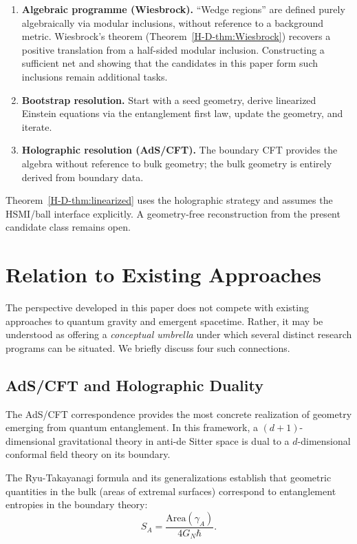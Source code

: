 \documentclass[12pt,a4paper,openany]{book}
\begin{document}
\begin{enumerate}
\item[(A)] \textbf{Algebraic programme (Wiesbrock).}
``Wedge regions'' are defined purely algebraically via modular inclusions, without reference to a background metric.
Wiesbrock's theorem (Theorem~\ref{H-D-thm:Wiesbrock}) recovers a positive translation from a half-sided modular inclusion.  Constructing a sufficient net and showing that the candidates in this paper form such inclusions remain additional tasks.

\item[(B)] \textbf{Bootstrap resolution.}
Start with a seed geometry, derive linearized Einstein equations via the entanglement first law, update the geometry, and iterate.

\item[(C)] \textbf{Holographic resolution (AdS/CFT).}
The boundary CFT provides the algebra without reference to bulk geometry; the bulk geometry is entirely derived from boundary data.
\end{enumerate}

Theorem~\ref{H-D-thm:linearized} uses the holographic strategy and assumes the HSMI/ball interface explicitly.  A geometry-free reconstruction from the present candidate class remains open.


\section{Relation to Existing Approaches}
\label{H-D-sec:relation}

The perspective developed in this paper does not compete with existing approaches to quantum gravity and emergent spacetime. Rather, it may be understood as offering a \emph{conceptual umbrella} under which several distinct research programs can be situated. We briefly discuss four such connections.

\subsection{AdS/CFT and Holographic Duality}

The AdS/CFT correspondence \cite{Maldacena1999} provides the most concrete realization of geometry emerging from quantum entanglement. In this framework, a $(d+1)$-dimensional gravitational theory in anti-de Sitter space is dual to a $d$-dimensional conformal field theory on its boundary.

The Ryu-Takayanagi formula \cite{RyuTakayanagi2006} and its generalizations establish that geometric quantities in the bulk (areas of extremal surfaces) correspond to entanglement entropies in the boundary theory:
\begin{equation}
S_A = \frac{\text{Area}(\gamma_A)}{4 G_N \hbar}.
\end{equation}
\end{document}
